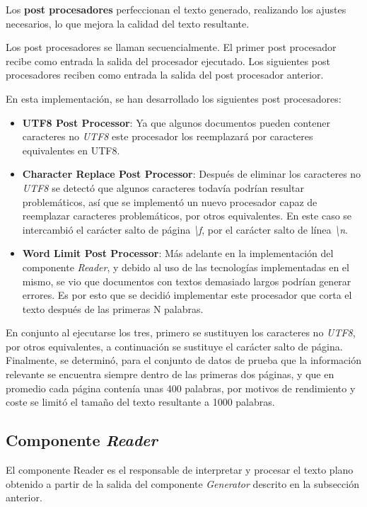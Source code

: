Los \textbf{post procesadores} perfeccionan el texto generado, realizando los ajustes necesarios, lo que mejora la
calidad del texto resultante.

Los post procesadores se llaman secuencialmente.
El primer post procesador recibe como entrada la salida del procesador ejecutado.
Los siguientes post procesadores reciben como entrada la salida del post procesador anterior.

En esta implementación, se han desarrollado los siguientes post procesadores:

\begin{itemize}
    \item
    \textbf{UTF8 Post Processor}: Ya que algunos documentos pueden contener caracteres no \textit{UTF8} este procesador
    los reemplazará por caracteres equivalentes en UTF8.

    \item
    \textbf{Character Replace Post Processor}: Después de eliminar los caracteres no \textit{UTF8} se detectó que
    algunos caracteres todavía podrían resultar problemáticos, así que se implementó un nuevo procesador capaz de
    reemplazar caracteres problemáticos, por otros equivalentes.
    En este caso se intercambió el carácter salto de página \textit{\textbackslash f}, por el carácter
    salto de línea \textit{\textbackslash n}.

    \item
    \textbf{Word Limit Post Processor}: Más adelante en la implementación del componente \textit{Reader}, y debido
    al uso de las tecnologías implementadas en el mismo, se vio que documentos con textos demasiado largos podrían
    generar errores.
    Es por esto que se decidió implementar este procesador que corta el texto después de las primeras N palabras.
\end{itemize}

En conjunto al ejecutarse los tres, primero se sustituyen los caracteres no \textit{UTF8}, por otros equivalentes, a
continuación se sustituye el carácter salto de página.
Finalmente, se determinó, para el conjunto de datos de prueba que la información relevante se encuentra siempre
dentro de las primeras dos páginas, y que en promedio cada página contenía unas 400 palabras, por motivos de
rendimiento y coste se limitó el tamaño del texto resultante a 1000 palabras.

\subsection*{Componente \textit{Reader}}\label{subsec:chapter_4.reader_component}
El componente Reader es el responsable de interpretar y procesar el texto plano obtenido a partir de la salida del
componente \textit{Generator} descrito en la subsección anterior.

